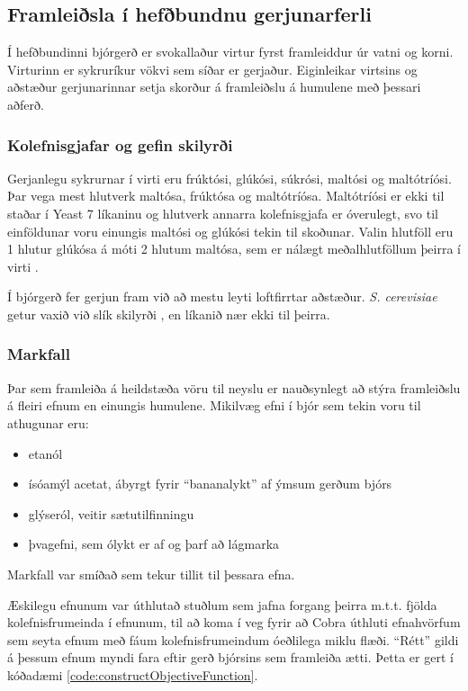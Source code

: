 \documentclass[11pt]{article}
\begin{document}
\begin{multicols}{2}
\subsection{Framleiðsla í hefðbundnu gerjunarferli}
\label{sec:hefdbundid}
Í hefðbundinni bjórgerð er svokallaður virtur fyrst framleiddur úr vatni og korni. Virturinn er sykruríkur vökvi sem síðar er gerjaður. Eiginleikar virtsins og aðstæður gerjunarinnar setja skorður á framleiðslu á humulene með þessari aðferð.
\subsubsection{Kolefnisgjafar og gefin skilyrði}
Gerjanlegu sykrurnar í virti eru frúktósi, glúkósi, súkrósi, maltósi og maltótríósi. Þar vega mest hlutverk maltósa, frúktósa og maltótríósa. Maltótríósi er ekki til staðar í Yeast 7 líkaninu og hlutverk annarra kolefnisgjafa er óverulegt, svo til einföldunar voru einungis maltósi og glúkósi tekin til skoðunar. Valin hlutföll eru 1 hlutur glúkósa á móti 2 hlutum maltósa, sem er nálægt meðalhlutföllum þeirra í virti \cite{otter1967determination}. 

Í bjórgerð fer gerjun fram við að mestu leyti loftfirrtar aðstæður. \emph{S. cerevisiae} getur vaxið við slík skilyrði \cite{ishtar2007factors}, en líkanið nær ekki til þeirra.
\subsubsection{Markfall}
Þar sem framleiða á heildstæða vöru til neyslu er nauðsynlegt að stýra framleiðslu á fleiri efnum en einungis humulene. Mikilvæg efni í bjór \cite{dequin2001potential} sem tekin voru til athugunar eru:
\begin{itemize}
 \item etanól
 \item ísóamýl acetat, ábyrgt fyrir ``bananalykt'' af ýmsum gerðum bjórs
 \item glýseról, veitir sætutilfinningu
 \item þvagefni, sem ólykt er af og þarf að lágmarka
\end{itemize}
Markfall var smíðað sem tekur tillit til þessara efna. 

Æskilegu efnunum var úthlutað stuðlum sem jafna forgang þeirra m.t.t. fjölda kolefnisfrumeinda í efnunum, til að koma í veg fyrir að Cobra úthluti efnahvörfum sem seyta efnum með fáum kolefnisfrumeindum óeðlilega miklu flæði. ``Rétt'' gildi á þessum efnum myndi fara eftir gerð bjórsins sem framleiða ætti. Þetta er gert í kóðadæmi \ref{code:constructObjectiveFunction}.


\end{multicols}
\end{document}
